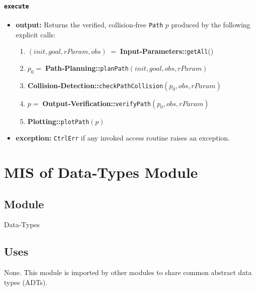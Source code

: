 \documentclass[12pt, titlepage]{article}
\begin{document}
\paragraph{\texttt{execute}}
\begin{itemize}
  \item \textbf{output:} Returns the verified, collision‑free
        \texttt{Path} $p$ produced by the following explicit calls:
        \begin{enumerate}
          \item $(\textit{init},\textit{goal},rParam,obs)\;=\;$\textbf{Input‑Parameters::}\texttt{getAll}()
          \item $p_0=\;$\textbf{Path‑Planning::}\texttt{planPath}$(\textit{init},\textit{goal},obs,rParam)$
          \item \textbf{Collision‑Detection::}\texttt{checkPathCollision}$(p_0,obs,rParam)$
          \item $p=\;$\textbf{Output‑Verification::}\texttt{verifyPath}$(p_0,obs,rParam)$
          \item \textbf{Plotting::}\texttt{plotPath}$(p)$
        \end{enumerate}
  \item \textbf{exception:} \texttt{CtrlErr} if any invoked access routine
        raises an exception.
\end{itemize}


\newpage



\section{MIS of Data‑Types Module}
\label{mod:dtypes}

\subsection{Module}
Data‑Types

\subsection{Uses}
None.  This module is imported by other modules to share common
abstract data types (ADTs).
\end{document}
